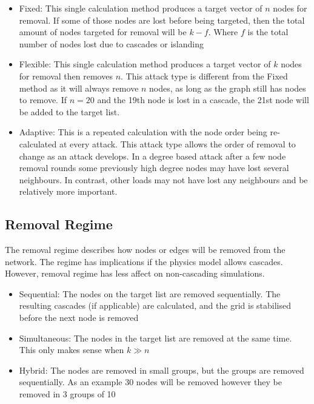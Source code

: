 \begin{itemize}
    \item Fixed: This single calculation method produces a target vector of $n$ nodes for removal. If some of those nodes are lost before being targeted, then the total amount of nodes targeted for removal will be $k-f$. Where $f$ is the total number of nodes lost due to cascades or islanding
 
    \item Flexible: This single calculation method produces a target vector of $k$ nodes for removal then removes $n$. This attack type is different from the Fixed method as it will always remove $n$ nodes, as long as the graph still has nodes to remove. If $n=20$ and the 19th node is lost in a cascade, the 21st node will be added to the target list.

    \item Adaptive: This is a repeated calculation with the node order being re-calculated at every attack. This attack type allows the order of removal to change as an attack develops. In a degree based attack after a few node removal rounds some previously high degree nodes may have lost several neighbours. In contrast, other loads may not have lost any neighbours and be relatively more important.
\end{itemize}

\subsection{Removal Regime}

The removal regime describes how nodes or edges will be removed from the network. The regime has implications if the physics model allows cascades. However, removal regime has less affect on non-cascading simulations.

\begin{itemize}
    \item Sequential: The nodes on the target list are removed sequentially. The resulting cascades (if applicable) are calculated, and the grid is stabilised before the next node is removed
    \item Simultaneous: The nodes in the target list are removed at the same time. This only makes sense when $k \gg n$
    \item Hybrid: The nodes are removed in small groups, but the groups are removed sequentially. As an example 30 nodes will be removed however they be removed in 3 groups of 10
\end{itemize}

